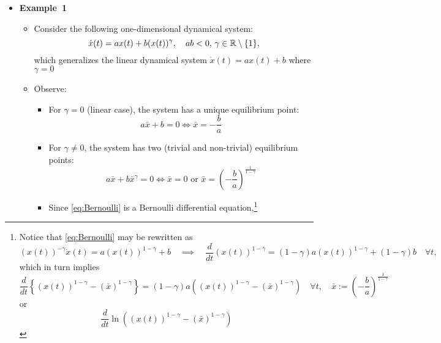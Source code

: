\documentclass[12pt,a4paper]{article}
\begin{document}
\begin{itemize}
\item \textbf{Example~1}
  \begin{itemize}
  \item Consider the following one-dimensional dynamical system:
    \begin{equation}\label{eq:Bernoulli}%
      \dot{x}(t) = ax(t) + b(x(t))^{\gamma},
      \quad ab < 0, \, \gamma\in \R\setminus\{1\},
    \end{equation}
    which generalizes the linear dynamical system $\dot{x}(t)= ax(t) + b$ where $\gamma=0$
  \item Observe:
    \begin{itemize}
    \item For $\gamma = 0$ (linear case),
      the system has a unique equilibrium point:
      \begin{equation}\nonumber%
        a\bar{x} + b = 0
        \iff
        \bar{x} = - \frac{b}{a}
      \end{equation}
    \item For $\gamma \neq 0$, the system has two (trivial and non-trivial) equilibrium points:
      \begin{equation}\nonumber%
        a\bar{x} + b\bar{x}^{\gamma} = 0
        \iff
        \bar{x} = 0
        \text{ or }
        \bar{x} = \left(- \frac{b}{a}\right)^{\frac{1}{1-\gamma}}
      \end{equation}
    \item Since \eqref{eq:Bernoulli} is a Bernoulli differential equation,\footnote{
        Notice that \eqref{eq:Bernoulli} may be rewritten as
        \begin{equation}\nonumber%
          (x(t))^{-\gamma}\dot{x}(t) = a(x(t))^{1-\gamma} + b
          \quad\implies\quad
          \frac{d}{dt}(x(t))^{1-\gamma} = (1-\gamma)a (x(t))^{1-\gamma} + (1-\gamma)b
          \quad \forall t,
        \end{equation}
        which in turn implies
        \begin{equation}\nonumber%
          \frac{d}{dt}\left\{ (x(t))^{1-\gamma} - (\bar{x})^{1-\gamma} \right\}
          = (1-\gamma)a\left((x(t))^{1-\gamma} - (\bar{x})^{1-\gamma}\right)
          \quad \forall t,
          \quad \bar{x}:= \left(- \frac{b}{a}\right)^{\frac{1}{1-\gamma}}
        \end{equation}
        or
        \begin{equation}\nonumber%
          \frac{d}{dt} \ln \left((x(t))^{1-\gamma} - (\bar{x})^{1-\gamma}\right)

\end{equation}}
\end{itemize}
\end{itemize}
\end{itemize}
\end{document}
